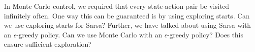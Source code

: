 In Monte Carlo control, we required that every state-action pair be visited infinitely often.
One way this can be guaranteed is by using exploring starts. Can we use exploring starts for Sarsa? Further, we have talked about using Sarsa with an $\epsilon$-greedy policy. Can we use Monte Carlo with an $\epsilon$-greedy policy? Does this ensure sufficient exploration?


